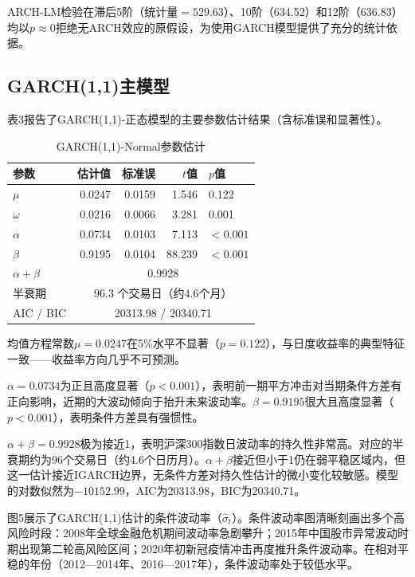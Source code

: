 \documentclass[11pt,a4paper]{article}
\begin{document}
ARCH-LM检验在滞后5阶（统计量$=529.63$）、10阶（634.52）和12阶（636.83）均以\(p\approx 0\)拒绝无ARCH效应的原假设，为使用GARCH模型提供了充分的统计依据。

\subsection{GARCH(1,1)主模型}

表3报告了GARCH(1,1)-正态模型的主要参数估计结果（含标准误和显著性）。

\begin{table}[ht]
\centering
\caption{GARCH(1,1)-Normal参数估计}
\begin{tabular}{lrrrl}
\toprule
参数 & 估计值 & 标准误 & \(t\)值 & \(p\)值 \\
\midrule
\(\mu\) & 0.0247 & 0.0159 & 1.546 & 0.122 \\
\(\omega\) & 0.0216 & 0.0066 & 3.281 & 0.001 \\
\(\alpha\) & 0.0734 & 0.0103 & 7.113 & \(<0.001\) \\
\(\beta\) & 0.9195 & 0.0104 & 88.239 & \(<0.001\) \\
\midrule
\(\alpha+\beta\) & \multicolumn{4}{c}{0.9928} \\
半衰期 & \multicolumn{4}{c}{96.3 个交易日（约4.6个月）} \\
AIC / BIC & \multicolumn{4}{c}{20313.98 / 20340.71} \\
\bottomrule
\end{tabular}
\end{table}

均值方程常数\(\mu=0.0247\)在5\%水平不显著（\(p=0.122\)），与日度收益率的典型特征一致——收益率方向几乎不可预测。

\(\alpha=0.0734\)为正且高度显著（\(p<0.001\)），表明前一期平方冲击对当期条件方差有正向影响，近期的大波动倾向于抬升未来波动率。\(\beta=0.9195\)很大且高度显著（\(p<0.001\)），表明条件方差具有强惯性。

\(\alpha+\beta=0.9928\)极为接近1，表明沪深300指数日波动率的持久性非常高。对应的半衰期约为96个交易日（约4.6个日历月）。\(\alpha+\beta\)接近但小于1仍在弱平稳区域内，但这一估计接近IGARCH边界，无条件方差对持久性估计的微小变化较敏感。模型的对数似然为$-10152.99$，AIC为20313.98，BIC为20340.71。

图5展示了GARCH(1,1)估计的条件波动率（\(\hat{\sigma}_t\)）。条件波动率图清晰刻画出多个高风险时段：2008年全球金融危机期间波动率急剧攀升；2015年中国股市异常波动时期出现第二轮高风险区间；2020年初新冠疫情冲击再度推升条件波动率。在相对平稳的年份（2012—2014年、2016—2017年），条件波动率处于较低水平。
\end{document}
